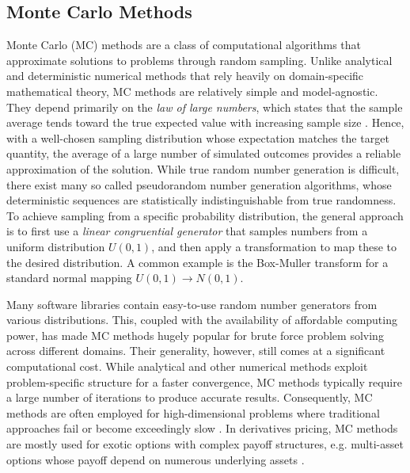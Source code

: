 \documentclass[english,12pt,a4paper,pdftex,sci,utf8]{aaltothesis}
\begin{document}
\subsection{Monte Carlo Methods}
Monte Carlo (MC) methods are a class of computational algorithms that approximate solutions to problems through random sampling. Unlike analytical and deterministic numerical methods that rely heavily on domain-specific mathematical theory, MC methods are relatively simple and model-agnostic. They depend primarily on the \emph{law of large numbers}, which states that the sample average tends toward the true expected value with increasing sample size \cite{Ross2020prob}. Hence, with a well-chosen sampling distribution whose expectation matches the target quantity, the average of a large number of simulated outcomes provides a reliable approximation of the solution. While true random number generation is difficult, there exist many so called pseudorandom number generation algorithms, whose deterministic sequences are statistically indistinguishable from true randomness. To achieve sampling from a specific probability distribution, the general approach is to first use a \emph{linear congruential generator} that samples numbers from a uniform distribution $U(0,1)$, and then apply a transformation to map these to the desired distribution. A common example is the Box-Muller transform for a standard normal mapping $U(0,1) \rightarrow N(0,1)$. \cite{gentle2003random}

Many software libraries contain easy-to-use random number generators from various distributions. This, coupled with the availability of affordable computing power, has made MC methods hugely popular for brute force problem solving across different domains. Their generality, however, still comes at a significant computational cost. While analytical and other numerical methods exploit problem-specific structure for a faster convergence, MC methods typically require a large number of iterations to produce accurate results. Consequently, MC methods are often employed for high-dimensional problems where traditional approaches fail or become exceedingly slow \cite{gentle2003random}. In derivatives pricing, MC methods are mostly used for exotic options with complex payoff structures, e.g. multi-asset options whose payoff depend on numerous underlying assets \cite{hull2016options,wilmott2013paul}.
\end{document}
